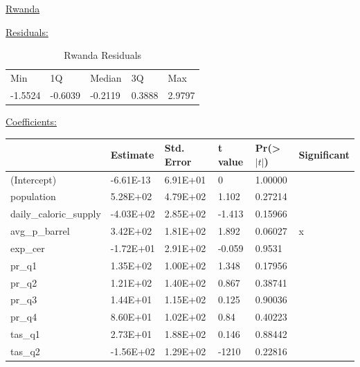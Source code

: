 \documentclass[11pt]{article}
\begin{document}
\newpage

\begin{center}\underline{Rwanda} \end{center}
\underline{Residuals:}
\FloatBarrier
\begin{table}[!htbp]
\centering
\begin{tabular}{lllll}
Min     & 1Q      & Median  & 3Q     & Max    \\
-1.5524 & -0.6039 & -0.2119 & 0.3888 & 2.9797
\end{tabular}
\caption{Rwanda Residuals}
\label{table15}
\end{table}
\FloatBarrier

\underline{Coefficients:} \\

\FloatBarrier
\begin{table}[!htbp]
\centering
\begin{tabular}{llllll}
\hline
                       & Estimate  & Std. Error & t value & Pr(\textgreater$|t|$) & Significant \\ \hline
(Intercept)            & -6.61E-13 & 6.91E+01   & 0       & 1.00000             &             \\
population             & 5.28E+02  & 4.79E+02   & 1.102   & 0.27214             &             \\
daily\_caloric\_supply & -4.03E+02 & 2.85E+02   & -1.413  & 0.15966             &             \\
avg\_p\_barrel         & 3.42E+02  & 1.81E+02   & 1.892   & 0.06027             & x           \\
exp\_cer               & -1.72E+01 & 2.91E+02   & -0.059  & 0.9531              &             \\
pr\_q1                 & 1.35E+02  & 1.00E+02   & 1.348   & 0.17956             &             \\
pr\_q2                 & 1.21E+02  & 1.40E+02   & 0.867   & 0.38741             &             \\
pr\_q3                 & 1.44E+01  & 1.15E+02   & 0.125   & 0.90036             &             \\
pr\_q4                 & 8.60E+01  & 1.02E+02   & 0.84    & 0.40223             &             \\
tas\_q1                & 2.73E+01  & 1.88E+02   & 0.146   & 0.88442             &             \\
tas\_q2                & -1.56E+02 & 1.29E+02   & -1210   & 0.22816             &             \\

\end{tabular}
\end{table}
\end{document}
